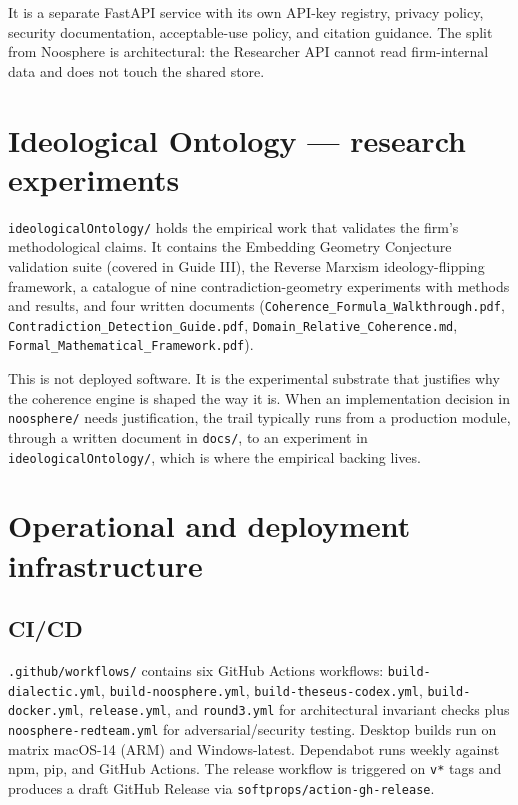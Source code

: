 \documentclass[11pt,letterpaper]{article}
\newcommand{\file}[1]{\texttt{#1}}
\begin{document}
It is a separate FastAPI service with its own API-key registry, privacy policy, security documentation, acceptable-use policy, and citation guidance. The split from Noosphere is architectural: the Researcher API cannot read firm-internal data and does not touch the shared store.

\section{Ideological Ontology --- research experiments}

\file{ideologicalOntology/} holds the empirical work that validates the firm's methodological claims. It contains the Embedding Geometry Conjecture validation suite (covered in Guide III), the Reverse Marxism ideology-flipping framework, a catalogue of nine contradiction-geometry experiments with methods and results, and four written documents (\file{Coherence\_Formula\_Walkthrough.pdf}, \file{Contradiction\_Detection\_Guide.pdf}, \file{Domain\_Relative\_Coherence.md}, \file{Formal\_Mathematical\_Framework.pdf}).

This is not deployed software. It is the experimental substrate that justifies why the coherence engine is shaped the way it is. When an implementation decision in \file{noosphere/} needs justification, the trail typically runs from a production module, through a written document in \file{docs/}, to an experiment in \file{ideologicalOntology/}, which is where the empirical backing lives.

\section{Operational and deployment infrastructure}

\subsection{CI/CD}

\file{.github/workflows/} contains six GitHub Actions workflows: \file{build-dialectic.yml}, \file{build-noosphere.yml}, \file{build-theseus-codex.yml}, \file{build-docker.yml}, \file{release.yml}, and \file{round3.yml} for architectural invariant checks plus \file{noosphere-redteam.yml} for adversarial/security testing. Desktop builds run on matrix macOS-14 (ARM) and Windows-latest. Dependabot runs weekly against npm, pip, and GitHub Actions. The release workflow is triggered on \texttt{v*} tags and produces a draft GitHub Release via \texttt{softprops/action-gh-release}.
\end{document}
